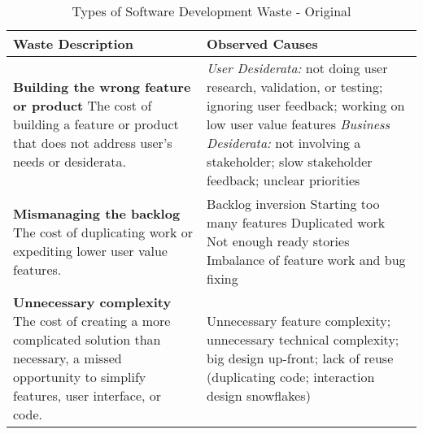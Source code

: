 \begin{table*}[htbp]
\renewcommand{\arraystretch}{1.3}
\centering
\caption{Types of Software Development Waste - Original}
\label{Waste}
\begin{tabular}{|p{2.5in}|p{3.6in}|} %
\hline
\textbf{Waste} \newline Description                                                                                                         & Observed Causes                                                                                                                                                                                                                                                                                                                                                                                                                    \\ \hline
\textbf{Building the wrong feature or product} \newline
The cost of building a feature or product that does not address user's needs or desiderata.                                  & \textit{User Desiderata:} not doing user research, validation, or testing; ignoring user feedback; working on low user value features \newline \textit{Business Desiderata:} not involving a stakeholder; slow stakeholder feedback; unclear priorities                                                                                                                                                                                  \\ \hline
\textbf{Mismanaging the backlog  } \newline The cost of duplicating work or expediting lower user value features.                                                       & Backlog inversion \newline Starting too many features \newline Duplicated work \newline Not enough ready stories  \newline Imbalance of feature work and bug fixing                                                                                                                                                                                                                                                                                                                                      \\ \hline
\textbf{Unnecessary complexity} \newline The cost of creating a more complicated solution than necessary,  a missed opportunity to simplify features, user interface, or code.      & Unnecessary feature complexity; unnecessary technical complexity; big design up-front;  lack of reuse (duplicating code; interaction design snowflakes)                                                

\end{tabular}
\end{table*}
